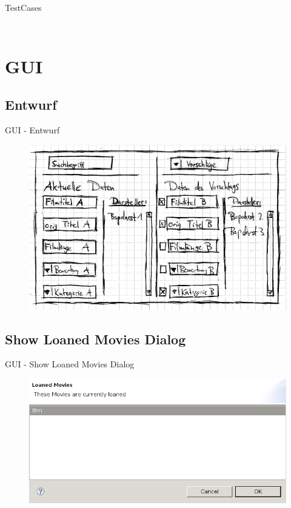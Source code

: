 \documentclass{beamer} %
\begin{document}
\begin{frame}{TestCases}
\begin{columns}[t]
\begin{column}{.5\linewidth}
\begin{figure}[H]
				\end{figure}
			\end{column}
		\end{columns}
	\end{frame}

	\section{GUI}
	\subsection{Entwurf}
	\begin{frame}{GUI - Entwurf}
		\begin{figure}[H]
			\centering
			\includegraphics[width=\linewidth]{gui-mockup.png}
		\end{figure}
	\end{frame}

	\subsection{Show Loaned Movies Dialog}
	\begin{frame}{GUI - Show Loaned Movies Dialog}
		\begin{figure}[H]
			\centering
			\includegraphics[width=\linewidth]{show-loaned-movies-dialog.png}
		\end{figure}
	\end{frame}
\end{document}
